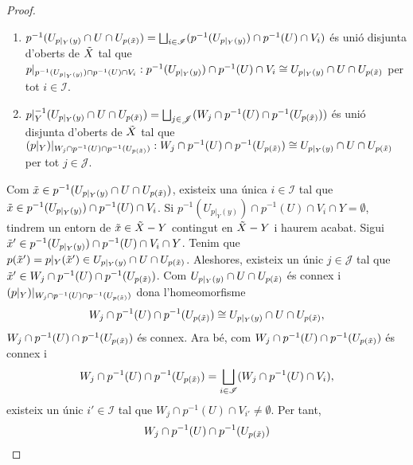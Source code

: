 \documentclass[compress,10pt]{article}
\theoremstyle{definition}
\begin{document}
\begin{proof}
    \begin{enumerate}
        \item $p^{-1}(U_{p|_{Y}(y)}\cap U\cap U_{p(\Tilde{x})})=\bigsqcup_{i\in\mathscr{I}}(p^{-1}(U_{p|_{Y}(y)})\cap p^{-1}(U)\cap V_{i})$ és unió disjunta d'oberts de $\Tilde{X}$ tal que $p|_{p^{-1}(U_{p|_{Y}(y)})\cap p^{-1}(U)\cap V_{i}}:p^{-1}(U_{p|_{Y}(y)})\cap p^{-1}(U)\cap V_{i}\cong U_{p|_{Y}(y)}\cap U\cap U_{p(\Tilde{x})}$ per tot $i\in\mathscr{I}$.
        \item $p|_{Y}^{-1}(U_{p|_{Y}(y)}\cap U\cap U_{p(\Tilde{x})})=\bigsqcup_{j\in\mathscr{J}}(W_{j}\cap p^{-1}(U)\cap p^{-1}(U_{p(\Tilde{x})}))$ és unió disjunta d'oberts de $\Tilde{X}$ tal que $(p|_{Y})|_{W_{j}\cap p^{-1}(U)\cap p^{-1}(U_{p(\Tilde{x})})}:W_{j}\cap p^{-1}(U)\cap p^{-1}(U_{p(\Tilde{x})})\cong U_{p|_{Y}(y)}\cap U\cap U_{p(\Tilde{x})}$ per tot $j\in\mathscr{J}$.
    \end{enumerate}
    Com $\Tilde{x}\in p^{-1}(U_{p|_{Y}(y)}\cap U\cap U_{p(\Tilde{x})})$, existeix una única $i\in\mathscr{I}$ tal que $\Tilde{x}\in p^{-1}(U_{p|_{Y}(y)})\cap p^{-1}(U)\cap V_{i}$. Si $p^{-1}(U_{p|_{Y}(y)})\cap p^{-1}(U)\cap V_{i}\cap Y=\emptyset$, tindrem un entorn de $\Tilde{x}\in\Tilde{X}-Y$ contingut en $\Tilde{X}-Y$ i haurem acabat. Sigui $\Tilde{x}'\in p^{-1}(U_{p|_{Y}(y)})\cap p^{-1}(U)\cap V_{i}\cap Y$. Tenim que $p(\Tilde{x}')=p|_{Y}(\Tilde{x}')\in U_{p|_{Y}(y)}\cap U\cap U_{p(\Tilde{x})}$. Aleshores, existeix un únic $j\in\mathscr{J}$ tal que $\Tilde{x}'\in W_{j}\cap p^{-1}(U)\cap p^{-1}(U_{p(\Tilde{x})})$. Com $U_{p|_{Y}(y)}\cap U\cap U_{p(\Tilde{x})}$ és connex i $(p|_{Y})|_{W_{j}\cap p^{-1}(U)\cap p^{-1}(U_{p(\Tilde{x})})}$ dona l'homeomorfisme
    \begin{equation}
        W_{j}\cap p^{-1}(U)\cap p^{-1}(U_{p(\Tilde{x})})
        \cong U_{p|_{Y}(y)}\cap U\cap U_{p(\Tilde{x})},
    \end{equation}
    $W_{j}\cap p^{-1}(U)\cap p^{-1}(U_{p(\Tilde{x})})$ és connex. Ara bé, com $W_{j}\cap p^{-1}(U)\cap p^{-1}(U_{p(\Tilde{x})})$ és connex i
    \begin{equation}
        W_{j}\cap p^{-1}(U)\cap p^{-1}(U_{p(\Tilde{x})})
        =\bigsqcup_{i\in\mathscr{I}}(W_{j}\cap p^{-1}(U)\cap V_{i}),
    \end{equation}
    existeix un únic $i'\in\mathscr{I}$ tal que $W_{j}\cap p^{-1}(U)\cap V_{i'}\neq\emptyset$. Per tant,
    \begin{equation}
    \begin{split}
        &W_{j}\cap p^{-1}(U)\cap p^{-1}(U_{p(\Tilde{x})})\\

\end{split}
\end{equation}
\end{proof}
\end{document}
